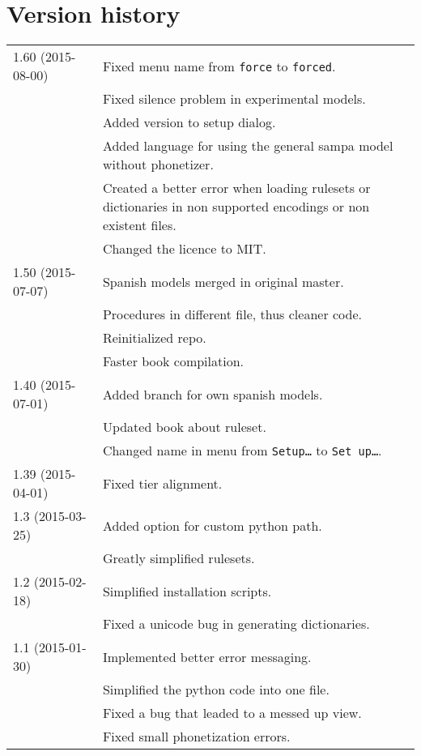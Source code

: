 \section{Version history}
\begin{longtable}{|p{0.22\linewidth}p{0.8\linewidth}|}
	\hline
	1.60 (2015-08-00) & \tabitem Fixed menu name from \texttt{force} to
\texttt{forced}.\\
		& \tabitem Fixed silence problem in experimental models.\\
		& \tabitem Added version to setup dialog.\\
		& \tabitem Added language for using the general sampa model without
			phonetizer.\\
		& \tabitem Created a better error when loading rulesets or dictionaries in
			non supported encodings or non existent files.\\
		& \tabitem Changed the licence to MIT.\\
	\hline
	1.50 (2015-07-07) & \tabitem Spanish models merged in original master.\\
		& \tabitem Procedures in different file, thus cleaner code.\\
		& \tabitem Reinitialized repo.\\
		& \tabitem Faster book compilation.\\
	\hline
	1.40 (2015-07-01) & \tabitem  Added branch for own spanish models.\\
		& \tabitem Updated book about ruleset.\\
		& \tabitem Changed name in menu from \texttt{Setup\ldots} to 
			\texttt{Set up\dots}.\\
	\hline
	1.39 (2015-04-01) & \tabitem Fixed tier alignment.\\
	\hline
	1.3 (2015-03-25) & \tabitem Added option for custom python path.\\
	 & \tabitem Greatly simplified rulesets.\\
	\hline
	1.2 (2015-02-18) & \tabitem Simplified installation scripts.\\
		& \tabitem Fixed a unicode bug in generating dictionaries.\\
	\hline
	1.1 (2015-01-30) & \tabitem Implemented better error messaging.\\
		& \tabitem Simplified the python code into one file.\\
		& \tabitem Fixed a bug that leaded to a messed up view.\\
		& \tabitem Fixed small phonetization errors.\\

\end{longtable}
